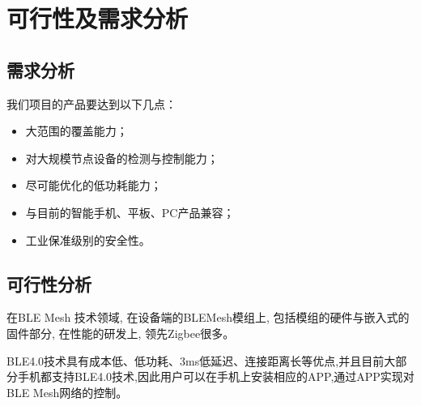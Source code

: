 \chapter{可行性及需求分析}

\section{需求分析}
我们项目的产品要达到以下几点：
  \begin{itemize}
    \item 大范围的覆盖能力；
    \item 对大规模节点设备的检测与控制能力；
    \item 尽可能优化的低功耗能力；
    \item 与目前的智能手机、平板、PC产品兼容；
    \item 工业保准级别的安全性。
  \end{itemize}

\section{可行性分析}
在BLE Mesh 技术领域, 在设备端的BLEMesh模组上, 包括模组的硬件与嵌入式的固件部分, 在性能的研发上, 领先Zigbee很多。

BLE4.0技术具有成本低、低功耗、3ms低延迟、连接距离长等优点,并且目前大部分手机都支持BLE4.0技术,因此用户可以在手机上安装相应的APP,通过APP实现对BLE Mesh网络的控制。